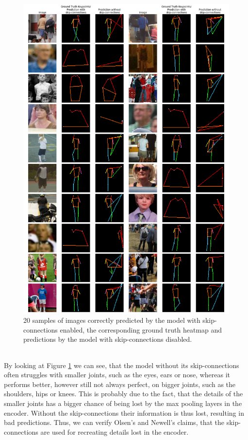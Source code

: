 \documentclass[./main.tex]{subfiles}
\begin{document}
\begin{figure}[htbp]
    \centering
    \includegraphics[width = \textwidth]{entities/pred_comparisons.png}
    \caption{20 samples of images correctly predicted by the model with skip-connections enabled, the corresponding ground truth heatmap and predictions by the model with skip-connections disabled.}
    \label{fig:pred_comparison}
\end{figure}
\\
By looking at Figure \ref{fig:pred_comparison} we can see, that the model without its skip-connections often struggles with smaller joints, such as the eyes, ears or nose, whereas it performs better, however still not always perfect, on bigger joints, such as the shoulders, hips or knees. This is probably due to the fact, that the details of the smaller joints has a bigger chance of being lost by the max pooling layers in the encoder. Without the skip-connections their information is thus lost, resulting in bad predictions. Thus, we can verify Olsen's \cite{Camilla} and Newell's \cite{Newell} claims, that the skip-connections are used for recreating details lost in the encoder. 
\end{document}
